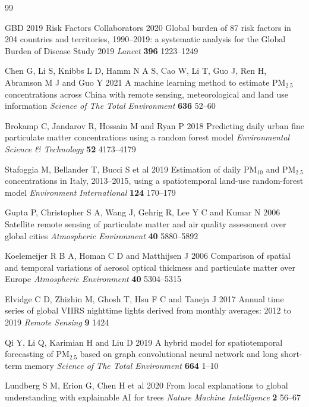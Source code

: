 \documentclass{iopjournal}
\begin{document}
\begin{thebibliography}{99}

GBD 2019 Risk Factors Collaborators 2020 Global burden of 87 risk
factors in 204 countries and territories, 1990--2019: a systematic
analysis for the Global Burden of Disease Study 2019
\textit{Lancet} \textbf{396} 1223--1249

Chen G, Li S, Knibbs L D, Hamm N A S, Cao W, Li T, Guo J, Ren H,
Abramson M J and Guo Y 2021 A machine learning method to estimate
PM$_{2.5}$ concentrations across China with remote sensing,
meteorological and land use information \textit{Science of The
Total Environment} \textbf{636} 52--60

Brokamp C, Jandarov R, Hossain M and Ryan P 2018 Predicting daily
urban fine particulate matter concentrations using a random forest
model \textit{Environmental Science \& Technology} \textbf{52}
4173--4179

Stafoggia M, Bellander T, Bucci S et al 2019 Estimation of daily
PM$_{10}$ and PM$_{2.5}$ concentrations in Italy, 2013--2015,
using a spatiotemporal land-use random-forest model
\textit{Environment International} \textbf{124} 170--179

Gupta P, Christopher S A, Wang J, Gehrig R, Lee Y C and Kumar N
2006 Satellite remote sensing of particulate matter and air
quality assessment over global cities \textit{Atmospheric
Environment} \textbf{40} 5880--5892

Koelemeijer R B A, Homan C D and Matthijsen J 2006 Comparison of
spatial and temporal variations of aerosol optical thickness and
particulate matter over Europe \textit{Atmospheric Environment}
\textbf{40} 5304--5315

Elvidge C D, Zhizhin M, Ghosh T, Hsu F C and Taneja J 2017 Annual
time series of global VIIRS nighttime lights derived from monthly
averages: 2012 to 2019 \textit{Remote Sensing} \textbf{9} 1424

Qi Y, Li Q, Karimian H and Liu D 2019 A hybrid model for
spatiotemporal forecasting of PM$_{2.5}$ based on graph
convolutional neural network and long short-term memory
\textit{Science of The Total Environment} \textbf{664} 1--10

Lundberg S M, Erion G, Chen H et al 2020 From local explanations to
global understanding with explainable AI for trees \textit{Nature
Machine Intelligence} \textbf{2} 56--67


\end{thebibliography}
\end{document}

